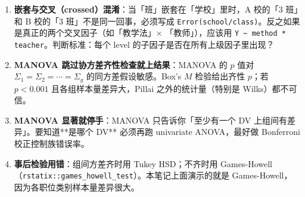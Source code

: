 \documentclass[
]{ctexart}
\begin{document}
\begin{pitfall}
\begin{enumerate}
\item \textbf{嵌套与交叉（crossed）混淆}：当「班」嵌套在「学校」里时，A 校的「3 班」和 B 校的「3 班」不是同一回事，必须写成 \texttt{Error(school/class)}。反之如果是真正的两个交叉因子（如「教学法」× 「教师」），应该用 \texttt{Y \~{} method * teacher}。判断标准：每个 level 的子因子是否在所有上级因子里出现？
\item \textbf{MANOVA 跳过协方差齐性检查就上结果}：MANOVA 的 $p$ 值对 $\Sigma_1 = \Sigma_2 = \cdots = \Sigma_g$ 的同方差假设敏感。Box's $M$ 检验给出齐性 $p$；若 $p < 0.001$ 且各组样本量差异大，Pillai 之外的统计量（特别是 Wilks）都不可信。
\item \textbf{MANOVA 显著就停手}：MANOVA 只告诉你「至少有一个 DV 上组间有差异」。要知道**是哪个 DV** 必须再跑 univariate ANOVA，最好做 Bonferroni 校正控制族错误率。
\item \textbf{事后检验用错}：组间方差齐时用 Tukey HSD；不齐时用 Games-Howell（\texttt{rstatix::games\_howell\_test}）。本笔记上面演示的就是 Games-Howell，因为各职位类别样本量差异很大。
\end{enumerate}
\end{pitfall}
\end{document}
